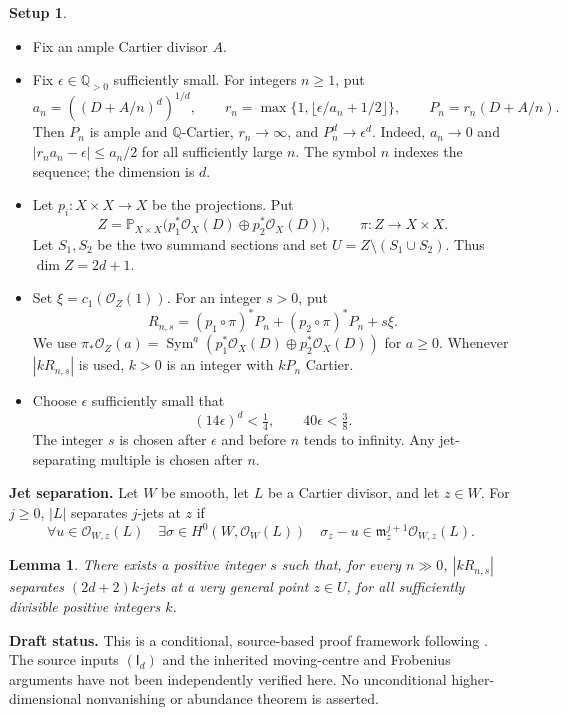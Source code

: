 \documentclass[12pt,a4paper,psamsfonts]{amsart}
\theoremstyle{definition}
\newtheorem*{setup}{Setup}
\theoremstyle{plain}
\newtheorem{lemma}{Lemma}[section]
\newcommand{\Q}{\mathbb Q}
\newcommand{\OO}{\mathcal O}
\newcommand{\PP}{\mathbb P}
\begin{document}
\begin{setup}
\leavevmode
\begin{itemize}
\setlength{\itemsep}{2pt}
\setlength{\parsep}{0pt}
\item Fix an ample Cartier divisor $A$.
\item Fix $\epsilon\in\Q_{>0}$ sufficiently small. For integers
$n\ge1$, put
\[
 a_n=((D+A/n)^d)^{1/d},\qquad
 r_n=\max\{1,\lfloor\epsilon/a_n+1/2\rfloor\},\qquad
 P_n=r_n(D+A/n).
\]
Then $P_n$ is ample and $\mathbb{Q}$-Cartier, $r_n\to\infty$, and
$P_n^d\to\epsilon^d$. Indeed, $a_n\to0$ and
$|r_na_n-\epsilon|\le a_n/2$ for all sufficiently large $n$.
The symbol $n$ indexes the sequence; the dimension is $d$.
\item Let $p_i:X\times X\to X$ be the projections. Put
\[
 Z=\PP_{X\times X}
       \bigl(p_1^*\OO_X(D)\oplus p_2^*\OO_X(D)\bigr),
 \qquad \pi:Z\to X\times X.
\]
Let $S_1,S_2$ be the two summand sections and set
$U=Z\setminus(S_1\cup S_2)$. Thus $\dim Z=2d+1$.
\item Set $\xi=c_1(\OO_Z(1))$. For an integer $s>0$, put
\[
 R_{n,s}=(p_1\circ\pi)^*P_n+(p_2\circ\pi)^*P_n+s\xi.
\]
We use $\pi_*\OO_Z(a)=\operatorname{Sym}^a
(p_1^*\OO_X(D)\oplus p_2^*\OO_X(D))$ for $a\ge0$.
Whenever $|kR_{n,s}|$ is used, $k>0$ is an integer with
$kP_n$ Cartier.
\item Choose $\epsilon$ sufficiently small that
\[
 (14\epsilon)^d<\tfrac14,\qquad40\epsilon<\tfrac38.
\]
The integer $s$ is chosen after $\epsilon$ and before $n$ tends
to infinity. Any jet-separating multiple is chosen after $n$.
\end{itemize}
\end{setup}

\medskip
\noindent\textbf{Jet separation.}
Let $W$ be smooth, let $L$ be a Cartier divisor, and let $z\in W$.
For $j\ge0$, $|L|$ separates $j$-jets at $z$ if
\[
 \forall u\in\OO_{W,z}(L)\quad
 \exists\sigma\in H^0(W,\OO_W(L))\quad
 \sigma_z-u\in\mathfrak m_z^{j+1}\OO_{W,z}(L).
\]

\begin{lemma}\label{lem:general-jets}
There exists a positive integer $s$ such that, for every $n\gg0$,
$|kR_{n,s}|$ separates $(2d+2)k$-jets at a very general point
$z\in U$, for all sufficiently divisible positive integers $k$.
\end{lemma}

\medskip
\noindent\textbf{Draft status.}
This is a conditional, source-based proof framework following
\cite[Sections~4--6]{NS}. The source inputs $(\mathsf I_d)$ and
the inherited moving-centre and Frobenius arguments have not been
independently verified here. No unconditional higher-dimensional
nonvanishing or abundance theorem is asserted.
\end{document}
